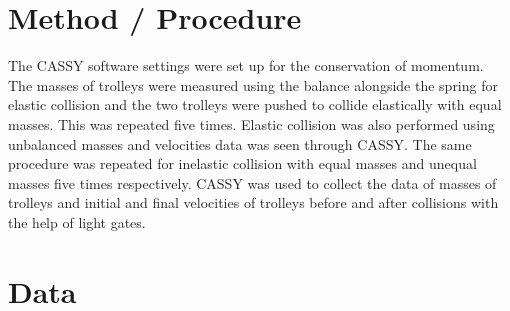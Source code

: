 

\section{Method / Procedure}
The CASSY software settings were set up for the conservation of momentum. The masses of trolleys were measured using the balance alongside the spring for elastic collision and the two trolleys were pushed to collide elastically with equal masses. This was repeated five times. Elastic collision was also performed using unbalanced masses and velocities data was seen through CASSY. The same procedure was repeated for inelastic collision with equal masses and unequal masses five times respectively. CASSY was used to collect the data of masses of trolleys and initial and final velocities of trolleys before and after collisions with the help of light gates. 




\section{Data}

